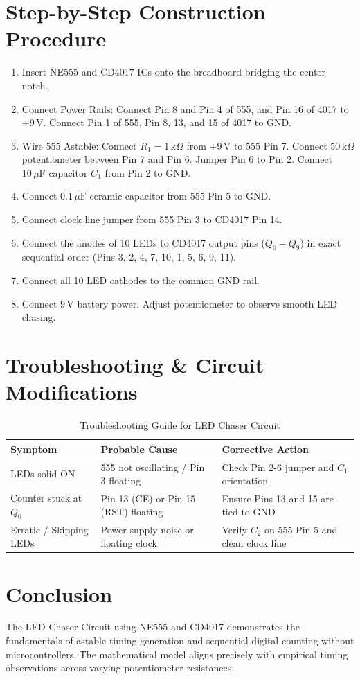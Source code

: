 \documentclass[11pt,a4paper]{article}
\begin{document}
\section{Step-by-Step Construction Procedure}
\begin{enumerate}
    \item Insert NE555 and CD4017 ICs onto the breadboard bridging the center notch.
    \item Connect Power Rails: Connect Pin 8 and Pin 4 of 555, and Pin 16 of 4017 to $+9\,\text{V}$. Connect Pin 1 of 555, Pin 8, 13, and 15 of 4017 to GND.
    \item Wire 555 Astable: Connect $R_1 = 1\,\text{k}\Omega$ from $+9\,\text{V}$ to 555 Pin 7. Connect $50\,\text{k}\Omega$ potentiometer between Pin 7 and Pin 6. Jumper Pin 6 to Pin 2. Connect $10\,\mu\text{F}$ capacitor $C_1$ from Pin 2 to GND.
    \item Connect $0.1\,\mu\text{F}$ ceramic capacitor from 555 Pin 5 to GND.
    \item Connect clock line jumper from 555 Pin 3 to CD4017 Pin 14.
    \item Connect the anodes of 10 LEDs to CD4017 output pins ($Q_0 - Q_9$) in exact sequential order (Pins 3, 2, 4, 7, 10, 1, 5, 6, 9, 11).
    \item Connect all 10 LED cathodes to the common GND rail.
    \item Connect $9\,\text{V}$ battery power. Adjust potentiometer to observe smooth LED chasing.
\end{enumerate}

\section{Troubleshooting \& Circuit Modifications}
\begin{table}[h!]
\centering
\caption{Troubleshooting Guide for LED Chaser Circuit}
\vspace{0.5em}
\begin{tabular}{@{}l p{5.5cm} p{6.5cm}@{}}
\toprule
\textbf{Symptom} & \textbf{Probable Cause} & \textbf{Corrective Action} \\
\midrule
LEDs solid ON & 555 not oscillating / Pin 3 floating & Check Pin 2-6 jumper and $C_1$ orientation \\
Counter stuck at $Q_0$ & Pin 13 (CE) or Pin 15 (RST) floating & Ensure Pins 13 and 15 are tied to GND \\
Erratic / Skipping LEDs & Power supply noise or floating clock & Verify $C_2$ on 555 Pin 5 and clean clock line \\
\bottomrule
\end{tabular}
\end{table}

\section{Conclusion}
The LED Chaser Circuit using NE555 and CD4017 demonstrates the fundamentals of astable timing generation and sequential digital counting without microcontrollers. The mathematical model aligns precisely with empirical timing observations across varying potentiometer resistances.
\end{document}
